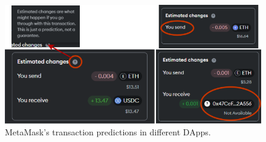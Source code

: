 \documentclass[conference]{IEEEtran}
\begin{document}
\begin{figure}[tb]
	\centering
	\includegraphics[width=\columnwidth]{screenshots/trx-predicted-changes-merged}
	\caption{MetaMask's transaction predictions in different DApps.}
	\label{figTrxPredictions}
\end{figure}
\end{document}
